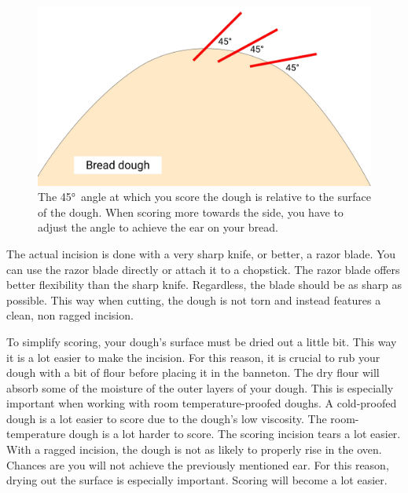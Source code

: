 \begin{figure}[htb!]
  \includegraphics[width=\textwidth]{bread-scoring-angle}
  \caption[Scoring angle]{The \ang{45}~angle at which you score the
      dough is relative to the surface of the dough.  When scoring more towards
      the side, you have to adjust the angle to achieve the ear on your
      bread.}%
  \label{fig:scoring-angle}
\end{figure}

The actual incision is done with a very sharp knife, or better, a razor
blade. You can use the razor blade directly or attach it to a chopstick.
The razor blade offers better flexibility than the sharp knife.
Regardless, the blade should be as sharp as possible. This way when cutting,
the dough is not torn and instead features a clean, non ragged incision.

To simplify scoring, your dough's surface must be dried out a little bit.
This way it is a lot easier to make the incision.
For this reason, it is crucial to rub your dough with a bit of flour
before placing it in the banneton. The dry flour will absorb some of the
moisture of the outer layers of your dough. This is especially important
when working with room temperature-proofed doughs. A cold-proofed dough
is a lot easier to score due to the dough's low viscosity. The room-temperature
dough is a lot harder to score. The scoring incision tears a lot
easier. With a ragged incision, the dough is not as likely to properly
rise in the oven. Chances are you will not achieve the previously mentioned
ear. For this reason, drying out the surface is especially important. Scoring
will become a lot easier.

